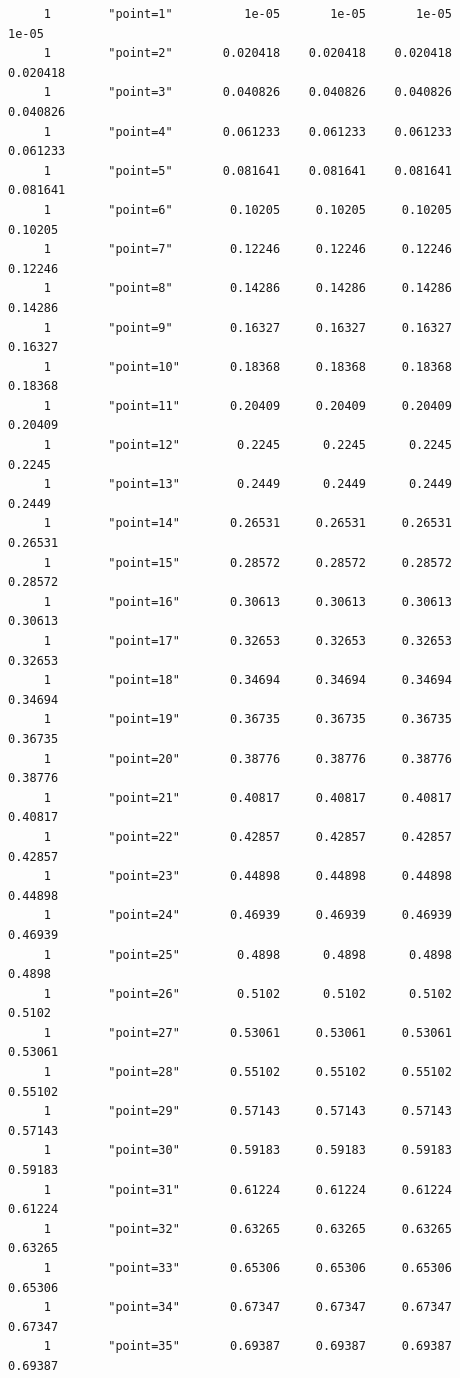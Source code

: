 \documentclass[
]{book}
\begin{document}
\begin{verbatim}
     1        "point=1"          1e-05       1e-05       1e-05       1e-05
     1        "point=2"       0.020418    0.020418    0.020418    0.020418
     1        "point=3"       0.040826    0.040826    0.040826    0.040826
     1        "point=4"       0.061233    0.061233    0.061233    0.061233
     1        "point=5"       0.081641    0.081641    0.081641    0.081641
     1        "point=6"        0.10205     0.10205     0.10205     0.10205
     1        "point=7"        0.12246     0.12246     0.12246     0.12246
     1        "point=8"        0.14286     0.14286     0.14286     0.14286
     1        "point=9"        0.16327     0.16327     0.16327     0.16327
     1        "point=10"       0.18368     0.18368     0.18368     0.18368
     1        "point=11"       0.20409     0.20409     0.20409     0.20409
     1        "point=12"        0.2245      0.2245      0.2245      0.2245
     1        "point=13"        0.2449      0.2449      0.2449      0.2449
     1        "point=14"       0.26531     0.26531     0.26531     0.26531
     1        "point=15"       0.28572     0.28572     0.28572     0.28572
     1        "point=16"       0.30613     0.30613     0.30613     0.30613
     1        "point=17"       0.32653     0.32653     0.32653     0.32653
     1        "point=18"       0.34694     0.34694     0.34694     0.34694
     1        "point=19"       0.36735     0.36735     0.36735     0.36735
     1        "point=20"       0.38776     0.38776     0.38776     0.38776
     1        "point=21"       0.40817     0.40817     0.40817     0.40817
     1        "point=22"       0.42857     0.42857     0.42857     0.42857
     1        "point=23"       0.44898     0.44898     0.44898     0.44898
     1        "point=24"       0.46939     0.46939     0.46939     0.46939
     1        "point=25"        0.4898      0.4898      0.4898      0.4898
     1        "point=26"        0.5102      0.5102      0.5102      0.5102
     1        "point=27"       0.53061     0.53061     0.53061     0.53061
     1        "point=28"       0.55102     0.55102     0.55102     0.55102
     1        "point=29"       0.57143     0.57143     0.57143     0.57143
     1        "point=30"       0.59183     0.59183     0.59183     0.59183
     1        "point=31"       0.61224     0.61224     0.61224     0.61224
     1        "point=32"       0.63265     0.63265     0.63265     0.63265
     1        "point=33"       0.65306     0.65306     0.65306     0.65306
     1        "point=34"       0.67347     0.67347     0.67347     0.67347
     1        "point=35"       0.69387     0.69387     0.69387     0.69387

\end{verbatim}
\end{document}
